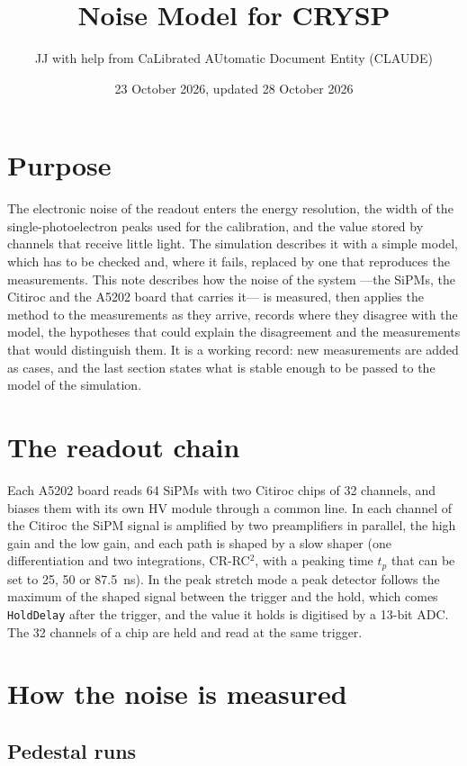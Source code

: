 \documentclass[11pt,a4paper]{article}
\title{Noise Model for CRYSP}
\author{JJ with help from CaLibrated AUtomatic Document Entity (CLAUDE)}
\date{23 October 2026, updated 28 October 2026}
\begin{document}
\maketitle

\section{Purpose}

The electronic noise of the readout enters the energy resolution, the width of the
single-photoelectron peaks used for the calibration, and the value stored by channels that
receive little light. The simulation describes it with a simple model, which has to be checked
and, where it fails, replaced by one that reproduces the measurements. This note describes how
the noise of the system ---the SiPMs, the Citiroc and the A5202 board that carries it--- is
measured, then applies the method to the measurements as they arrive, records where they
disagree with the model, the hypotheses that could explain the disagreement and the
measurements that would distinguish them. It is a working record: new measurements are added
as cases, and the last section states what is stable enough to be passed to the model of the
simulation.

\section{The readout chain}

Each A5202 board reads 64 SiPMs with two Citiroc chips of 32 channels, and biases them with its
own HV module through a common line. In each channel of the Citiroc the SiPM signal is
amplified by two preamplifiers in parallel, the high gain and the low gain, and each path is
shaped by a slow shaper (one differentiation and two integrations, CR-RC$^2$, with a peaking
time $t_p$ that can be set to 25, 50 or 87.5~ns). In the peak stretch mode a peak detector
follows the maximum of the shaped signal between the trigger and the hold, which comes
\texttt{HoldDelay} after the trigger, and the value it holds is digitised by a 13-bit ADC. The
32 channels of a chip are held and read at the same trigger.

\section{How the noise is measured}
\label{sec:method}

\subsection{Pedestal runs}
\end{document}
